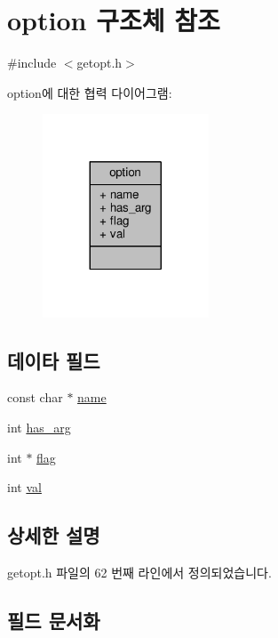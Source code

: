\hypertarget{structoption}{}\section{option 구조체 참조}
\label{structoption}


{\ttfamily \#include $<$getopt.\+h$>$}



option에 대한 협력 다이어그램\+:
\nopagebreak
\begin{figure}[H]
\begin{center}
\leavevmode
\includegraphics[width=140pt]{structoption__coll__graph}
\end{center}
\end{figure}
\subsection*{데이타 필드}
\begin{DoxyCompactItemize}
\item 
const char $\ast$ \hyperlink{structoption_a8f8f80d37794cde9472343e4487ba3eb}{name}
\item 
int \hyperlink{structoption_afd57c1e532cb0bc43cc77ac7b4dd3350}{has\+\_\+arg}
\item 
int $\ast$ \hyperlink{structoption_a4f1a91bc2d61b12ffb90ff2857d6a4d8}{flag}
\item 
int \hyperlink{structoption_aa0ccb5ee6d882ee3605ff47745c6467b}{val}
\end{DoxyCompactItemize}


\subsection{상세한 설명}


getopt.\+h 파일의 62 번째 라인에서 정의되었습니다.



\subsection{필드 문서화}
